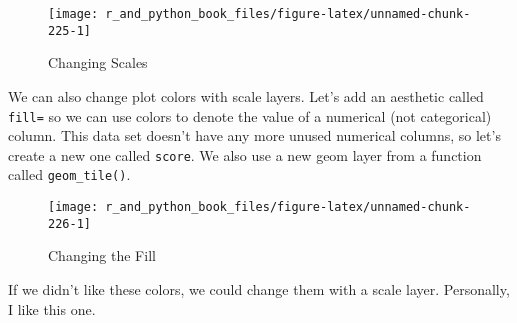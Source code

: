 \documentclass[
  12pt,
  krantz2]{krantz}
\makeatletter
\newenvironment{Shaded}{\begin{snugshade}}{\end{snugshade}}
\newcommand{\AttributeTok}[1]{\textcolor[rgb]{0.61,0.61,0.61}{#1}}
\newcommand{\DecValTok}[1]{\textcolor[rgb]{0.06,0.06,0.06}{#1}}
\newcommand{\FunctionTok}[1]{\textcolor[rgb]{0,0,0}{#1}}
\newcommand{\NormalTok}[1]{#1}
\newcommand{\OtherTok}[1]{\textcolor[rgb]{0.37,0.37,0.37}{#1}}
\newcommand{\SpecialCharTok}[1]{\textcolor[rgb]{0,0,0}{#1}}
\newenvironment{kframe}{%
\medskip{}
\setlength{\fboxsep}{.8em}
 \def\at@end@of@kframe{}%
 \ifinner\ifhmode%
  \def\at@end@of@kframe{\end{minipage}}%
  \begin{minipage}{\columnwidth}%
 \fi\fi%
 \def\FrameCommand##1{\hskip\@totalleftmargin \hskip-\fboxsep
 \colorbox{shadecolor}{##1}\hskip-\fboxsep
     \hskip-\linewidth \hskip-\@totalleftmargin \hskip\columnwidth}%
 \MakeFramed {\advance\hsize-\width
   \@totalleftmargin\z@ \linewidth\hsize
   \@setminipage}}%
 {\par\unskip\endMakeFramed%
 \at@end@of@kframe}
\renewenvironment{Shaded}{\begin{kframe}}{\end{kframe}}
\makeatother
\begin{document}
\begin{figure}

{\centering \texttt{[image: r\_and\_python\_book\_files/figure-latex/unnamed-chunk-225-1]} 

}

\caption{Changing Scales}\label{fig:unnamed-chunk-225}
\end{figure}

We can also change plot colors with scale layers. Let's add an aesthetic called \texttt{fill=} so we can use colors to denote the value of a numerical (not categorical) column. This data set doesn't have any more unused numerical columns, so let's create a new one called \texttt{score}. We also use a new geom layer from a function called \texttt{geom\_tile()}.

\begin{Shaded}
\end{Shaded}

\begin{figure}

{\centering \texttt{[image: r\_and\_python\_book\_files/figure-latex/unnamed-chunk-226-1]} 

}

\caption{Changing the Fill}\label{fig:unnamed-chunk-226}
\end{figure}

If we didn't like these colors, we could change them with a scale layer. Personally, I like this one.

\begin{Shaded}
\end{Shaded}
\end{document}
